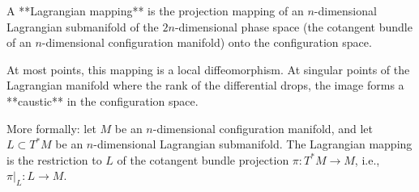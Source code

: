 A **Lagrangian mapping** is the projection mapping of an $n$-dimensional Lagrangian submanifold of the $2n$-dimensional phase space (the cotangent bundle of an $n$-dimensional configuration manifold) onto the configuration space.

At most points, this mapping is a local diffeomorphism. At singular points of the Lagrangian manifold where the rank of the differential drops, the image forms a **caustic** in the configuration space.

More formally: let $M$ be an $n$-dimensional configuration manifold, and let $L \subset T^*M$ be an $n$-dimensional Lagrangian submanifold. The Lagrangian mapping is the restriction to $L$ of the cotangent bundle projection $\pi: T^*M \to M$, i.e., $\pi|_L: L \to M$.
